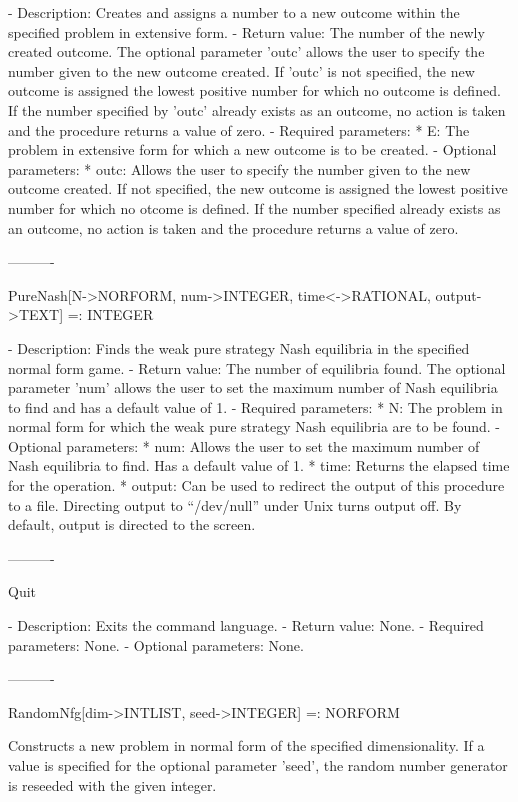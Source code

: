    -	Description:  Creates and assigns a number to a new outcome within the
	specified problem in extensive form.  
   -	Return value:  The number of the newly created outcome.  The optional 
	parameter 'outc' allows the user to specify the number given to the new
	outcome created.  If 'outc' is not specified, the new outcome is 
	assigned the lowest positive number for which no outcome is defined.  
	If the number specified by 'outc' already exists as an outcome, no 
	action is taken and the procedure returns a value of zero.
   -	Required parameters:
	  *  E:  The problem in extensive form for which a new outcome is to
	     be created.
   -	Optional parameters:
	  *  outc:  Allows the user to specify the number given to the new 
	     outcome created.  If not specified, the new outcome is assigned
	     the lowest positive number for which no otcome is defined.  If the
	     number specified already exists as an outcome, no action is taken
	     and the procedure returns a value of zero.

----------

PureNash[N->NORFORM, {num->INTEGER}, {time<->RATIONAL}, {output->TEXT}]
	 =: INTEGER

   -	Description:  Finds the weak pure strategy Nash equilibria in the 
	specified normal form game.  
   -	Return value:  The number of equilibria found.  The optional parameter 
	'num' allows the user to set the maximum number of Nash equilibria to 
	find and has a default value of 1.
   -	Required parameters:
	  *  N:  The problem in normal form for which the weak pure strategy
	     Nash equilibria are to be found.
   -	Optional parameters:
	  *  num:  Allows the user to set the maximum number of Nash equilibria
	     to find.  Has a default value of 1.
	  *  time:  Returns the elapsed time for the operation.
	  *  output:  Can be used to redirect the output of this procedure to a
	     file.  Directing output to ``/dev/null'' under Unix turns output 
	     off.  By default, output is directed to the screen.  

----------

Quit

   -	Description:  Exits the command language.
   -	Return value:  None.
   -	Required parameters:  None.
   -	Optional parameters:  None.

----------

RandomNfg[dim->INTLIST, {seed->INTEGER}] =: NORFORM

	Constructs a new problem in normal form of the specified
dimensionality.  If a value is specified for the optional parameter 'seed',
the random number generator is reseeded with the given integer.

